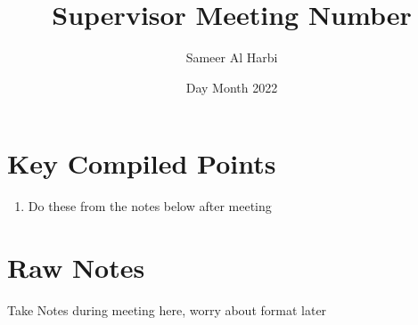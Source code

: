 \documentclass{article}
\title{ Supervisor Meeting \textbf{Number} }
\author{Sameer Al Harbi}
\date{Day Month 2022}
\begin{document}
\maketitle

\section{Key Compiled Points}
\begin{enumerate}
    \item Do these from the notes below after meeting
\end{enumerate}

\section{Raw Notes}

Take Notes during meeting here, worry about format later
\end{document}
